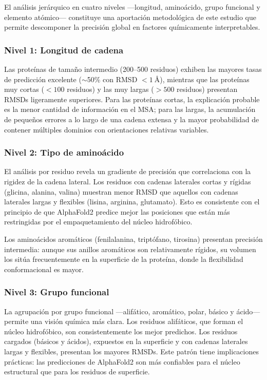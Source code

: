 El an\'alisis jer\'arquico en cuatro niveles ---longitud, amino\'acido, grupo funcional
y elemento at\'omico--- constituye una aportaci\'on metodol\'ogica de este estudio que
permite descomponer la precisi\'on global en factores qu\'imicamente interpretables.

\subsubsection{Nivel 1: Longitud de cadena}

Las prote\'inas de tama\~no intermedio (200--500 residuos) exhiben las mayores tasas
de predicci\'on excelente ($\sim$50\% con RMSD $< \SI{1}{\angstrom}$), mientras que
las prote\'inas muy cortas ($< 100$ residuos) y las muy largas ($> 500$ residuos)
presentan RMSDs ligeramente superiores. Para las prote\'inas cortas, la explicaci\'on
probable es la menor cantidad de informaci\'on en el MSA; para las largas, la
acumulaci\'on de peque\~nos errores a lo largo de una cadena extensa y la mayor
probabilidad de contener m\'ultiples dominios con orientaciones relativas variables.

\subsubsection{Nivel 2: Tipo de amino\'acido}

El an\'alisis por residuo revela un gradiente de precisi\'on que correlaciona con la
rigidez de la cadena lateral. Los residuos con cadenas laterales cortas y r\'igidas
(glicina, alanina, valina) muestran menor RMSD que aquellos con cadenas laterales largas
y flexibles (lisina, arginina, glutamato). Esto es consistente con el principio de que
AlphaFold2 predice mejor las posiciones que est\'an m\'as restringidas por el
empaquetamiento del n\'ucleo hidrofóbico.

Los amino\'acidos arom\'aticos (fenilalanina, tript\'ofano, tirosina) presentan precisi\'on
intermedia: aunque sus anillos arom\'aticos son relativamente r\'igidos, su volumen los
sit\'ua frecuentemente en la superficie de la prote\'ina, donde la flexibilidad
conformacional es mayor.

\subsubsection{Nivel 3: Grupo funcional}

La agrupaci\'on por grupo funcional ---alif\'atico, arom\'atico, polar, b\'asico y
\'acido--- permite una visi\'on qu\'imica m\'as clara. Los residuos alif\'aticos, que
forman el n\'ucleo hidrofóbico, son consistentemente los mejor predichos. Los residuos
cargados (b\'asicos y \'acidos), expuestos en la superficie y con cadenas laterales
largas y flexibles, presentan los mayores RMSDs. Este patr\'on tiene implicaciones
pr\'acticas: las predicciones de AlphaFold2 son m\'as confiables para el n\'ucleo
estructural que para los residuos de superficie.

